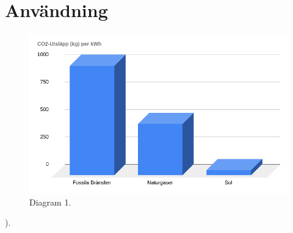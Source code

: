 \documentclass{article}
\begin{document}

\pagebreak
\section{Användning}

\begin{figure}[h]
	\centering
	\includegraphics{diagram1}
\caption{Diagram 1.}
\label{fig:dig1}
\end{figure}

).\newline
\end{document}
